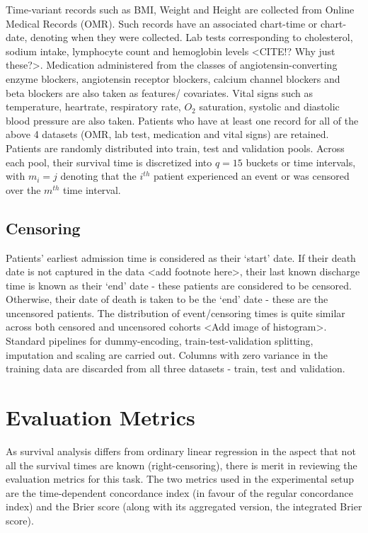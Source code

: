 \documentclass[%
 reprint,
 amsmath,amssymb,
 aps,
]{revtex4-2}
\begin{document}
Time-variant records such as BMI, Weight and Height are collected from Online Medical Records (OMR). Such records have an associated chart-time or chart-date, denoting when they were collected. Lab tests corresponding to cholesterol, sodium intake, lymphocyte count and hemoglobin levels <CITE!? Why just these?>. Medication administered from the classes of angiotensin-converting enzyme blockers, angiotensin receptor blockers, calcium channel blockers and beta blockers are also taken as features/ covariates. Vital signs such as temperature, heartrate, respiratory rate, $O_2$ saturation, systolic and diastolic blood pressure are also taken. Patients who have at least  one record for all of the above 4 datasets (OMR, lab test, medication and vital signs) are retained.\\

Patients are randomly distributed into train, test and validation pools. Across each pool, their survival time is discretized into $q=15$ buckets or time intervals, with $m_i=j$ denoting that the $i^{th}$ patient experienced an event or was censored over the $m^{th}$ time interval.

\subsection{\label{censoring}Censoring}
Patients' earliest admission time is considered as their `start' date. If their death date is not captured in the data <add footnote here>, their last known discharge time is known as their `end' date - these patients are considered to be censored. Otherwise, their date of death is taken to be the `end' date - these are the uncensored patients. The distribution of event/censoring times is quite similar across both censored and uncensored cohorts <Add image of histogram>. Standard pipelines for dummy-encoding, train-test-validation splitting, imputation and scaling are carried out. Columns with zero variance in the training data are discarded from all three datasets - train, test and validation.

\section{\label{metrics}Evaluation Metrics}
As survival analysis differs from ordinary linear regression in the aspect that not all the survival times are known (right-censoring), there is merit in reviewing the evaluation metrics for this task. The two metrics used in the experimental setup are the time-dependent concordance index (in favour of the regular concordance index) and the Brier score (along with its aggregated version, the integrated Brier score).
\end{document}

